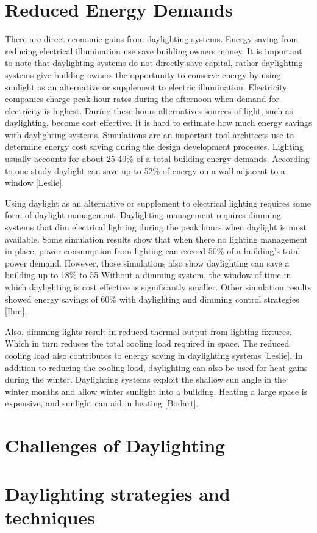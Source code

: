 \section{Reduced Energy Demands}
There are direct economic gains from daylighting systems. Energy saving from reducing electrical illumination use save building owners money.
It is important to note that daylighting systems do not directly save capital, rather daylighting systems give building owners the opportunity to conserve energy by using sunlight as an alternative or supplement to electric illumination. Electricity companies charge peak hour rates during the afternoon when demand for electricity is highest. During these hours alternatives sources of light, such as daylighting, become cost effective.
It is hard to estimate how much energy savings with daylighting systems. Simulations are an important tool architects use to determine energy cost saving during the design development processes.  Lighting usually accounts for about 25-40\% of a total building energy demands.
According to one study daylight can save up to 52\% of energy on a wall adjacent to a window [Leslie].

Using daylight as an alternative or supplement to electrical lighting requires some form of daylight management. Daylighting management requires dimming systems that dim electrical lighting during the peak hours when daylight is most available.  Some simulation results show that when there no lighting management in place,  power consumption from lighting can exceed 50\% of a building's total power demand.
However, those simulations also show daylighting can save a building up to 18\% to 55%
Without a dimming system, the window of time in which daylighting is cost effective is significantly smaller. Other simulation results showed energy savings of 60\% with daylighting and dimming control strategies [Ihm].

Also, dimming lights result in reduced thermal output from lighting fixtures. Which in turn reduces the total cooling load required in space. The reduced cooling load also contributes to energy saving in daylighting systems [Leslie].  In addition to reducing the cooling load, daylighting can also be used for heat gains during the winter. Daylighting systems exploit the shallow sun angle in the winter months and allow winter sunlight into a building. Heating a large space is expensive, and sunlight can aid in heating [Bodart].

\section{Challenges of Daylighting}

\section{Daylighting strategies and techniques}

